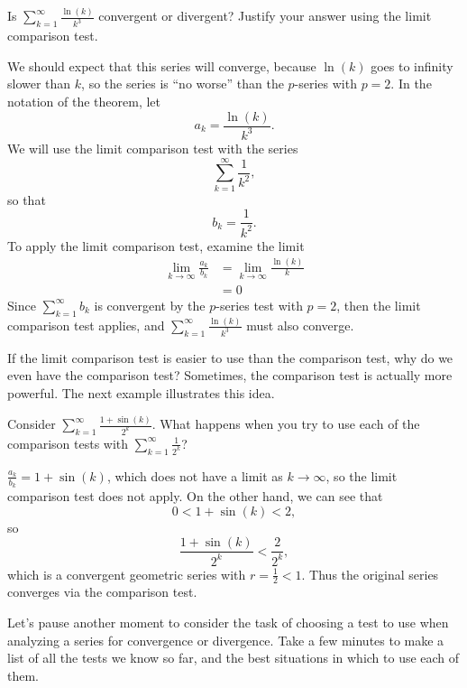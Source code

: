 \documentclass{ximera}
\begin{document}
\begin{example}
  Is $\sum_{k=1}^\infty \frac{\ln(k)}{k^3}$ convergent or divergent?
  Justify your answer using the limit comparison test.
  \begin{explanation}
    We should expect that this series will converge, because $\ln(k)$
    goes to infinity slower than $k$, so the series is ``no worse''
    than the $p$-series with $p=2$. In the notation of the theorem,
    let
    \[
    a_k = \frac{\ln(k)}{k^3}.
    \]
    We will use the limit comparison test with the series
    \[
    \sum_{k=1}^\infty \frac{1}{k^2},
    \]
    so that
    \[
    b_k = \frac{1}{k^2}.
    \]
    To apply the limit comparison test, examine the limit
    \begin{align*}
    \lim_{k \to \infty} \frac{a_k}{b_k} &= \lim_{k \to \infty} \frac{\ln(k)}{k} \\
    &= 0
    \end{align*}
    Since $\sum_{k=1}^\infty b_k$ is convergent by the
    $p$-series test with $p=2$, then the limit comparison
    test applies, and $\sum_{k=1}^\infty \frac{\ln(k)}{k^3}$
    must also converge.
  \end{explanation}
\end{example}

If the limit comparison test is easier to use than the comparison
test, why do we even have the comparison test?  Sometimes, 
the comparison test is actually more powerful.  The next example
illustrates this idea.

\begin{question}
  Consider $\sum_{k=1}^\infty \frac{1+\sin(k)}{2^k}$.  What happens 
  when you try to use each of the comparison tests with $\sum_{k=1}^\infty \frac{1}{2^k}$?
  \begin{selectAll}
  \end{selectAll}
  
  \begin{hint}
    $\frac{a_k}{b_k} = 1+\sin(k)$, which does not have a limit as $k
    \to \infty$, so the limit comparison test does not apply.  On the
    other hand, we can see that
    \[
    0<1+\sin(k)<2,
    \]
    so
    \[
    \frac{1+\sin(k)}{2^k} < \frac{2}{2^k},
    \]
    which is a convergent geometric series with $r = \frac{1}{2}<1$.
    Thus the original series converges via the comparison test.
  \end{hint}
\end{question}

Let's pause another moment to consider the task of choosing a test to use 
when analyzing a series for convergence or divergence.  Take a few minutes 
to make a list of all the tests we know so far, and the best situations in which 
to use each of them.
\end{document}
